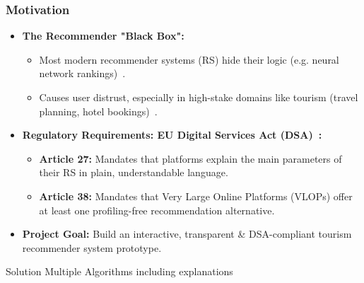\begin{frame}
    \frametitle{Motivation}
    \begin{itemize}
        \item \textbf{The Recommender "Black Box":}
            \begin{itemize}
                \item Most modern recommender systems (RS) hide their logic (e.g. neural network rankings)~\cite{adomavicius2005toward, BORRAS20147370}.
                \item Causes user distrust, especially in high-stake domains like tourism (travel planning, hotel bookings)~\cite{ricci2011travel, knijnenburg2012explaining}.
            \end{itemize}
        \item \textbf{Regulatory Requirements: EU Digital Services Act (DSA)~\cite{eudsa2022}:}
            \begin{itemize}
                \item \textbf{Article 27:} Mandates that platforms explain the main parameters of their RS in plain, understandable language.
                \item \textbf{Article 38:} Mandates that Very Large Online Platforms (VLOPs) offer at least one profiling-free recommendation alternative.
            \end{itemize}
        \item \textbf{Project Goal:} Build an interactive, transparent \& DSA-compliant tourism recommender system prototype.
    \end{itemize}
\end{frame}



\PraesentationMasterWeissBlau
\begin{frame}
    \begin{center}
        \huge Solution
        \vspace{1em}
        \large Multiple Algorithms including explanations
    \end{center}
\end{frame}
\PraesentationMasterStandard

